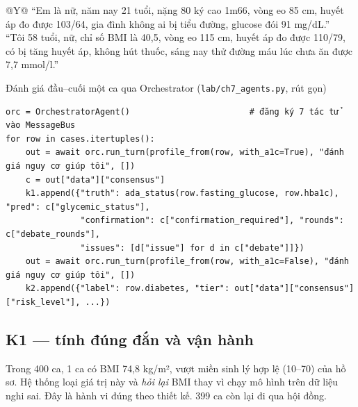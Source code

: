 \begin{table}[H]
\centering
\caption{Ví dụ tin nhắn sinh cho kịch bản K3 và giá trị đúng tương ứng}
\label{tab:k3-examples}
\small
\begin{tabularx}{\linewidth}{@{}Y@{}}
\toprule
``Em là nữ, năm nay 21 tuổi, nặng 80 ký cao 1m66, vòng eo 85 cm, huyết áp đo được 103/64, gia đình không ai bị tiểu đường, glucose đói 91 mg/dL.'' \\
``Tôi 58 tuổi, nữ, chỉ số BMI là 40,5, vòng eo 115 cm, huyết áp đo được 110/79, có bị tăng huyết áp, không hút thuốc, sáng nay thử đường máu lúc chưa ăn được 7,7 mmol/l.'' \\
\bottomrule
\end{tabularx}
\end{table}

\begin{code}{Đánh giá đầu–cuối một ca qua Orchestrator (\texttt{lab/ch7\_agents.py}, rút gọn)}
\label{lst:ch7-eval}
\begin{verbatim}
orc = OrchestratorAgent()                        # đăng ký 7 tác tử vào MessageBus
for row in cases.itertuples():
    out = await orc.run_turn(profile_from(row, with_a1c=True), "đánh giá nguy cơ giúp tôi", [])
    c = out["data"]["consensus"]
    k1.append({"truth": ada_status(row.fasting_glucose, row.hba1c), "pred": c["glycemic_status"],
               "confirmation": c["confirmation_required"], "rounds": c["debate_rounds"],
               "issues": [d["issue"] for d in c["debate"]]})
    out = await orc.run_turn(profile_from(row, with_a1c=False), "đánh giá nguy cơ giúp tôi", [])
    k2.append({"label": row.diabetes, "tier": out["data"]["consensus"]["risk_level"], ...})
\end{verbatim}
\end{code}

\subsection{K1 — tính đúng đắn và vận hành}

Trong 400 ca, 1 ca có BMI 74,8 kg/m², vượt miền sinh lý hợp lệ (10–70) của hồ sơ. Hệ thống loại giá trị này và \emph{hỏi lại} BMI thay vì chạy mô hình trên dữ liệu nghi sai. Đây là hành vi đúng theo thiết kế. 399 ca còn lại đi qua hội đồng.


